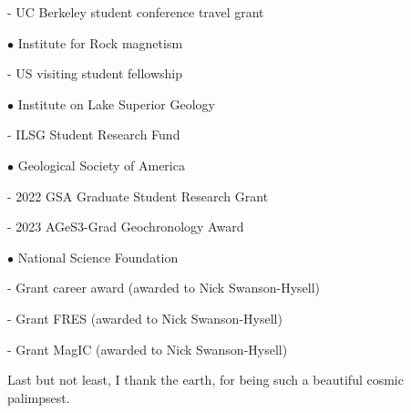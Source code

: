 \documentclass{ucbthesis}
\begin{document}
\begin{frontmatter}
\begin{acknowledgements}
    \hspace{\parindent} - UC Berkeley student conference travel grant
\vspace{5mm}

$\bullet$ Institute for Rock magnetism
    \vspace{5mm}
    
    \hspace{\parindent} - US visiting student fellowship
    \vspace{5mm}
    
$\bullet$ Institute on Lake Superior Geology
    \vspace{5mm}
    
    \hspace{\parindent} - ILSG Student Research Fund
    \vspace{5mm}
    
$\bullet$ Geological Society of America
    \vspace{5mm}
    
    \hspace{\parindent} - 2022 GSA Graduate Student Research Grant 
    \vspace{5mm}
    
    \hspace{\parindent} - 2023 AGeS3-Grad Geochronology Award
    \vspace{5mm}
    
$\bullet$ National Science Foundation
    \vspace{5mm}

    \hspace{\parindent} - Grant career award  (awarded to Nick Swanson-Hysell)
    \vspace{5mm}
    
    \hspace{\parindent} - Grant FRES  (awarded to Nick Swanson-Hysell)
    \vspace{5mm}
    
    \hspace{\parindent} - Grant MagIC  (awarded to Nick Swanson-Hysell)
    \vspace{15mm}
    
Last but not least, I thank the earth, for being such a beautiful cosmic palimpsest. 

\end{acknowledgements}




\end{frontmatter}

\pagestyle{headings}








\printbibliography

\end{document}

